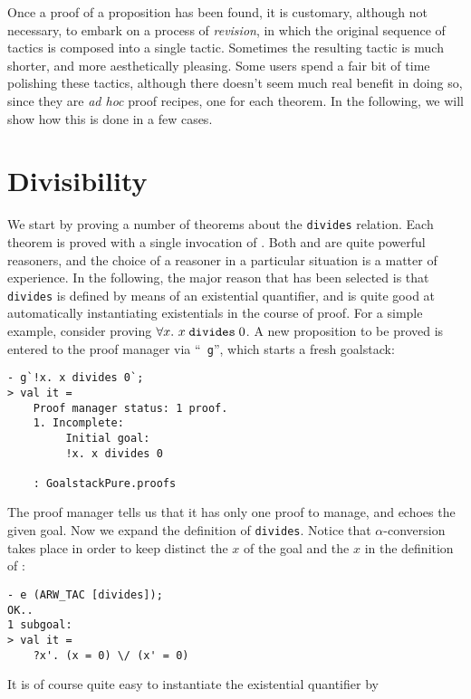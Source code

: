 Once a proof of a proposition has been found, it is customary, although
not necessary, to embark on a process of {\it revision}, in which the
original sequence of tactics is composed into a single tactic. Sometimes
the resulting tactic is much shorter, and more aesthetically
pleasing. Some users spend a fair bit of time polishing these tactics,
although there doesn't seem much real benefit in doing so, since they
are {\it ad hoc\/} proof recipes, one for each theorem. In the
following, we will show how this is done in a few cases.

\section{Divisibility}

We start by proving a number of theorems about the \verb+divides+
relation. Each theorem is proved with a single invocation of
. Both
 and  are quite powerful reasoners, and
the choice of a reasoner in a particular situation is a matter of
experience. In the following, the major reason that  has
been selected is that \verb+divides+ is defined by means of an existential
quantifier, and  is quite good at automatically
instantiating existentials in the course of proof. For a simple example,
consider proving $\forall x.\ x\; \mbox{\tt divides}\; 0$. A new
proposition to be proved is entered to the proof manager via ``{\tt
g}'', which starts a fresh goalstack:
\begin{session}\begin{verbatim}
- g`!x. x divides 0`;
> val it =
    Proof manager status: 1 proof.
    1. Incomplete:
         Initial goal:
         !x. x divides 0

    : GoalstackPure.proofs
\end{verbatim}\end{session}
The proof manager tells us that it has only one proof to manage, and
echoes the given goal. Now we expand the definition of
\verb+divides+. Notice that $\alpha$-conversion takes place in order to
keep distinct the $x$ of the goal and the $x$ in the definition of
:
\begin{session}\begin{verbatim}
- e (ARW_TAC [divides]);
OK..
1 subgoal:
> val it =
    ?x'. (x = 0) \/ (x' = 0)
\end{verbatim}\end{session}
It is of course quite easy to instantiate the existential quantifier by
